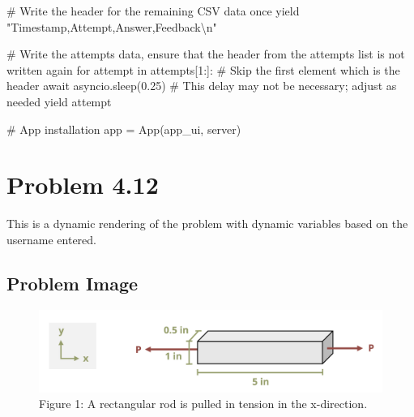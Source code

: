 \documentclass[
  letterpaper,
  DIV=11,
  numbers=noendperiod]{scrreprt}
\newenvironment{Shaded}{\begin{snugshade}}{\end{snugshade}}
\newcommand{\NormalTok}[1]{\textcolor[rgb]{0.00,0.23,0.31}{#1}}
\begin{document}
\begin{Shaded}
\begin{Highlighting}[]
\NormalTok{        \# Write the header for the remaining CSV data once}
\NormalTok{        yield "Timestamp,Attempt,Answer,Feedback\textbackslash{}n"}
        
\NormalTok{        \# Write the attempts data, ensure that the header from the attempts list is not written again}
\NormalTok{        for attempt in attempts[1:]:  \# Skip the first element which is the header}
\NormalTok{            await asyncio.sleep(0.25)  \# This delay may not be necessary; adjust as needed}
\NormalTok{            yield attempt}


\NormalTok{\# App installation}
\NormalTok{app = App(app\_ui, server)}
\end{Highlighting}
\end{Shaded}

\chapter*{Problem 4.12}\label{problem-4.12}


This is a dynamic rendering of the problem with dynamic variables based
on the username entered.

\section*{Problem Image}\label{problem-image-28}


\begin{figure}[H]

{\centering \includegraphics{images/216.png}

}

\caption{Figure 1: A rectangular rod is pulled in tension in the
x-direction.}

\end{figure}%
\end{document}
